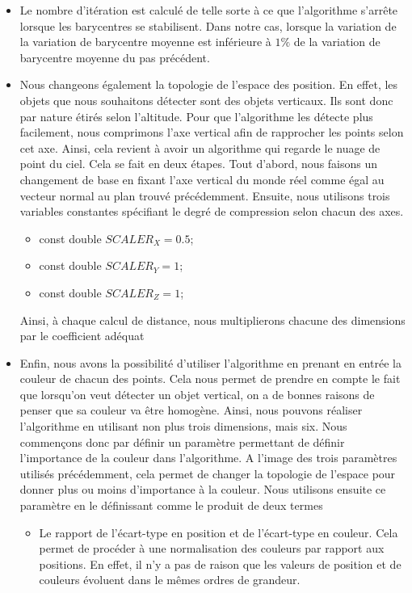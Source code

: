 \documentclass[titlepage,11pt,a4paper]{article}
\begin{document}
\begin{itemize}
\item{Le nombre d'itération est calculé de telle sorte à ce que l'algorithme s'arrête lorsque les barycentres se stabilisent. Dans notre cas, lorsque la variation de la variation de barycentre moyenne est inférieure à $1\%$  de la variation de barycentre moyenne du pas précédent.}
\item{Nous changeons également la topologie de l'espace des position. En effet, les objets que nous souhaitons détecter sont des objets verticaux. Ils sont donc par nature étirés selon l'altitude. Pour que l'algorithme les détecte plus facilement, nous comprimons l'axe vertical afin de rapprocher les points selon cet axe. Ainsi, cela revient à avoir un algorithme qui regarde le nuage de point du ciel. Cela se fait en deux étapes. Tout d'abord, nous faisons un changement de base en fixant l'axe vertical du monde réel comme égal au vecteur normal au plan trouvé précédemment. Ensuite, nous utilisons trois variables constantes spécifiant le degré de compression selon chacun des axes.
\begin{itemize}
\item{const double $SCALER_X = 0.5$;}
\item{const double $SCALER_Y =1$;}
\item{const double $SCALER_Z = 1$;}
\end{itemize}
Ainsi, à chaque calcul de distance, nous multiplierons chacune des dimensions par le coefficient adéquat}
\item{Enfin, nous avons la possibilité d'utiliser l'algorithme en prenant en entrée la couleur de chacun des points. Cela nous permet de prendre en compte le fait que lorsqu'on veut détecter un objet vertical, on a de bonnes raisons de penser que sa couleur va être homogène. Ainsi, nous pouvons réaliser l'algorithme en utilisant non plus trois dimensions, mais six. Nous commençons donc par définir un paramètre permettant de définir l'importance de la couleur dans l'algorithme. A l'image des trois paramètres utilisés précédemment, cela permet de changer la topologie de l'espace pour donner plus ou moins d'importance à la couleur. Nous utilisons ensuite ce paramètre en le définissant comme le produit de deux termes
\begin{itemize}
\item{Le rapport de l'écart-type en position et de l'écart-type en couleur. Cela permet de procéder à une normalisation des couleurs par rapport aux positions. En effet, il n'y a pas de raison que les valeurs de position et de couleurs évoluent dans le mêmes ordres de grandeur.}

\end{itemize}}
\end{itemize}
\end{document}
